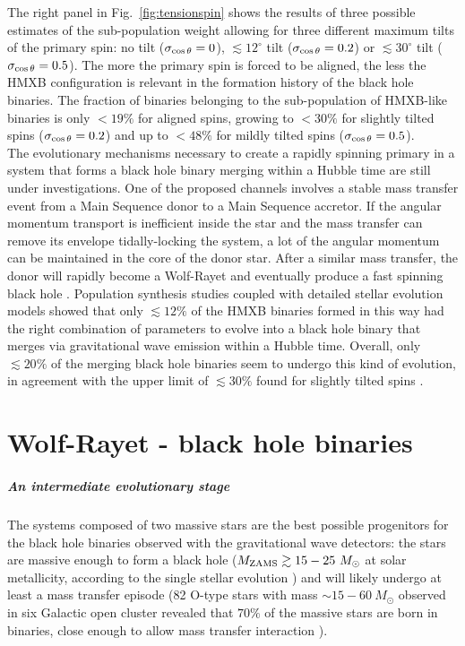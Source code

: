 \documentclass[a4paper,titlepage]{book}     	%
\newcommand{\sun}{\ensuremath{_\odot}}
\newcommand{\mzams}{M_\textup{ZAMS}}
\newcommand{\msun}{\ensuremath{M\sun}}
\begin{document}
The right panel in Fig.\ \ref{fig:tensionspin} shows the results of three possible estimates of the sub-population weight allowing for three different maximum tilts of the primary spin: no tilt ($\sigma_{\rm \cos \theta} = 0$), $\lesssim 12^{\circ}$ tilt ($\sigma_{\rm \cos \theta} = 0.2$) or $\lesssim 30^{\circ}$ tilt ($\sigma_{\rm \cos \theta} = 0.5$). The more the primary spin is forced to be aligned, the less the HMXB configuration is relevant in the formation history of the black hole binaries. The fraction of binaries belonging to the sub-population of HMXB-like binaries is only $< 19 \% $ for aligned spins, growing to $< 30 \%$ for slightly tilted spins ($\sigma_{\rm \cos \theta} = 0.2$) and up to $< 48 \%$ for mildly tilted spins ($\sigma_{\rm \cos \theta} = 0.5$).\\

The evolutionary mechanisms necessary to create a rapidly spinning primary in a system that forms a black hole binary merging within a Hubble time are still under investigations. One of the proposed channels involves a stable mass transfer event from a Main Sequence donor to a Main Sequence accretor. If the angular momentum transport is inefficient inside the star and the mass transfer can remove its envelope tidally-locking the system, a lot of the angular momentum can be maintained in the core of the donor star. After a similar mass transfer, the donor will rapidly become a Wolf-Rayet and eventually produce a fast spinning black hole \cite{spinfastBH_Qin2019}. Population synthesis studies coupled with detailed stellar evolution models showed that only $\lesssim 12 \%$ of the HMXB binaries formed in this way had the right combination of parameters to evolve into a black hole binary that merges via gravitational wave emission within a Hubble time. Overall, only $\lesssim 20 \%$ of the merging black hole binaries seem to undergo this kind of evolution, in agreement with the upper limit of $\lesssim 30 \%$ found for slightly tilted spins \cite{HMXBHspins2022}.





\chapter{Wolf-Rayet - black hole binaries}
\paragraph{An intermediate evolutionary stage}
The systems composed of two massive stars are the best possible progenitors for the black hole binaries observed with the gravitational wave detectors: the stars are massive enough to form a black hole ($\mzams \gtrsim 15-25~\msun$ at solar metallicity, according to the single stellar evolution \cite{Limongi2017_handbookSN}) and will likely undergo at least a mass transfer episode (82 O-type stars with mass $\sim 15-60~\msun$ observed in six Galactic open cluster revealed that $70 \%$ of the massive stars are born in binaries, close enough to allow mass transfer interaction \cite{Sana2012}). 
\end{document}
